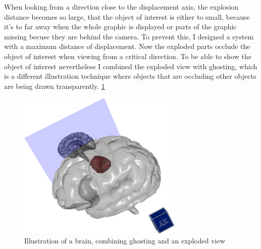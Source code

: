 When looking from a direction close to the displacement axis, the explosion distance becomes so large, that the object of interest is either to small, because it's to far away when the whole graphic is displayed or parts of the graphic missing becuse they are behind the camera.
To prevent this, I designed a system with a maximum distance of displacement. Now the exploded parts occlude the object of interest when viewing from a critical direction. To be able to show the object of interest nevertheless I combined the exploded view with ghosting, which is a different illustration technique where objects that are occluding other objects are being drawn transparently. \ref{fig:demo}\\
\begin{figure}[tb]
	\centering
	\includegraphics[width=0.7\textwidth]{chapters/figures/demo}
	\caption{Illustration of a brain, combining ghosting and an exploded view}
	\label{fig:demo}
\end{figure}